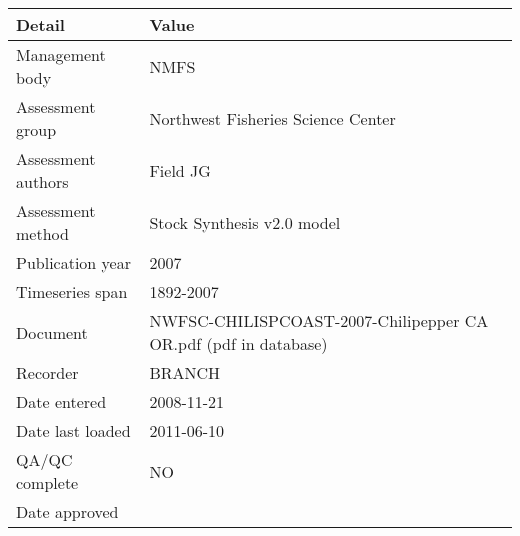 \begin{table}[htb]
\centering
\begin{tabular}{lp{7cm}}
\toprule
Detail & Value \\
\midrule
Management body    & NMFS                                                            \\
Assessment group   & Northwest Fisheries Science Center                              \\
Assessment authors & Field JG                                                        \\
Assessment method  & Stock Synthesis v2.0 model                                      \\
Publication year   & 2007                                                            \\
Timeseries span    & 1892-2007                                                       \\
Document           & NWFSC-CHILISPCOAST-2007-Chilipepper CA OR.pdf (pdf in database) \\
Recorder           & BRANCH                                                          \\
Date entered       & 2008-11-21                                                      \\
Date last loaded   & 2011-06-10                                                      \\
QA/QC complete     & NO                                                              \\
Date approved      &                                                                 \\
\bottomrule
\end{tabular}
\label{tab:assessdet}
\end{table}
